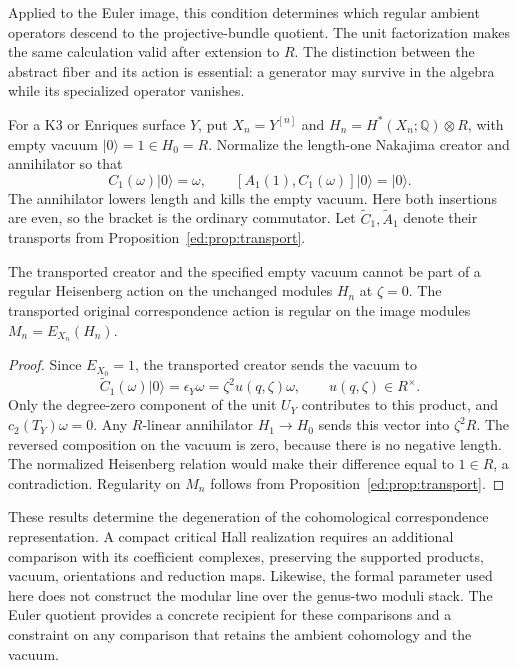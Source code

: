 Applied to the Euler image, this condition determines which regular
ambient operators descend to the projective-bundle quotient. The unit
factorization makes the same calculation valid after extension to $R$.
The distinction between the abstract fiber and its action is essential:
a generator may survive in the algebra while its specialized operator
vanishes.

For a K3 or Enriques surface $Y$, put $X_n=Y^{[n]}$ and
$H_n=H^*(X_n;\mathbb Q)\otimes R$, with empty vacuum
$|0\rangle=1\in H_0=R$. Normalize the length-one Nakajima creator and
annihilator so that
\[
 C_1(\omega)|0\rangle=\omega,\qquad
 [A_1(1),C_1(\omega)]|0\rangle=|0\rangle.
\]
The annihilator lowers length and kills the empty vacuum. Here both
insertions are even, so the bracket is the ordinary commutator.
Let $\widetilde C_1,\widetilde A_1$ denote their transports from
Proposition~\ref{ed:prop:transport}.

\begin{proposition}\label{ed:prop:vacuum}
The transported creator and the specified empty vacuum cannot be part
of a regular Heisenberg action on the unchanged modules $H_n$ at
$\zeta=0$. The transported original correspondence action is regular
on the image modules $M_n=E_{X_n}(H_n)$.
\end{proposition}

\begin{proof}
Since $E_{X_0}=1$, the transported creator sends the vacuum to
\[
 \widetilde C_1(\omega)|0\rangle
 =\epsilon_Y\omega=\zeta^2u(q,\zeta)\omega,
 \qquad u(q,\zeta)\in R^\times.
\]
Only the degree-zero component of the unit $U_Y$ contributes to this
product, and $c_2(T_Y)\omega=0$.
Any $R$-linear annihilator $H_1\to H_0$ sends this vector into
$\zeta^2R$. The reversed composition on the vacuum is zero, because
there is no negative length. The normalized Heisenberg relation would
make their difference equal to $1\in R$, a contradiction.
Regularity on $M_n$ follows from Proposition~\ref{ed:prop:transport}.
\end{proof}

These results determine the degeneration of the cohomological
correspondence representation. A compact critical Hall realization
requires an additional comparison with its coefficient complexes,
preserving the supported products, vacuum, orientations and reduction
maps. Likewise, the formal parameter used here does not construct the
modular line over the genus-two moduli stack. The Euler quotient
provides a concrete recipient for these comparisons and a constraint
on any comparison that retains the ambient cohomology and the vacuum.
